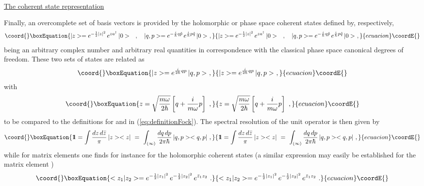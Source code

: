 \documentclass[a4paper,11pt]{article}
\def\one{1\hskip -.37em 1}
\begin{document}
\vspace{10pt}

\noindent\underline{The coherent state representation}

\vspace{5pt}

Finally, an overcomplete set of basis vectors is provided by the
holomorphic or phase space coherent states defined by, 
respectively,\cite{Klaud3}
\begin{equation}\coord{}\boxEquation{
|z>=e^{-\frac{1}{2}|z|^2}\,e^{za^\dagger}\,|0>\ \ \ ,\ \ \ 
|q,p>=e^{-\frac{i}{\hbar}q\hat{p}}\,e^{\frac{i}{\hbar}p\hat{q}}\,|0>\ ,
}{
|z>=e^{-\frac{1}{2}|z|^2}\,e^{za^\dagger}\,|0>\ \ \ ,\ \ \ 
|q,p>=e^{-\frac{i}{\hbar}q\hat{p}}\,e^{\frac{i}{\hbar}p\hat{q}}\,|0>\ ,
}{ecuacion}\coordE{}\end{equation}
\myHighlight{$z$}\coordHE{} being an arbitrary complex number and \coordHE{} arbitrary
real quantities in correspondence with the classical phase space
canonical degrees of freedom. These two sets of states are related as
\begin{equation}\coord{}\boxEquation{
|z>=e^{\frac{i}{2\hbar}qp}\,|q,p>\ ,
}{
|z>=e^{\frac{i}{2\hbar}qp}\,|q,p>\ ,
}{ecuacion}\coordE{}\end{equation}
with
\begin{equation}\coord{}\boxEquation{
z=\sqrt{\frac{m\omega}{2\hbar}}\left[q+\frac{i}{m\omega}p\right]\ ,
}{
z=\sqrt{\frac{m\omega}{2\hbar}}\left[q+\frac{i}{m\omega}p\right]\ ,
}{ecuacion}\coordE{}\end{equation}
to be compared to the definitions for \myHighlight{$a$}\coordHE{} and \coordHE{} in
(\ref{eq:definitionFock}). The spectral resolution of the unit
operator is then given by
\begin{equation}\coord{}\boxEquation{
\one=\int\frac{dz\,d\bar{z}}{\pi}\,|z><z|\ =\
\int_{(\infty)}\frac{dq\,dp}{2\pi\hbar}\,|q,p><q,p|\ ,
}{
\one=\int\frac{dz\,d\bar{z}}{\pi}\,|z><z|\ =\
\int_{(\infty)}\frac{dq\,dp}{2\pi\hbar}\,|q,p><q,p|\ ,
}{ecuacion}\coordE{}\end{equation}
while for matrix elements one finds for instance for the holomorphic
coherent states (a similar expression may easily be established for the
matrix element \myHighlight{$<q_1,p_1|q_2,p_2>$}\coordHE{})
\begin{equation}\coord{}\boxEquation{
<z_1|z_2>=e^{-\frac{1}{2}|z_1|^2}\,e^{-\frac{1}{2}|z_2|^2}\,
e^{\bar{z}_1z_2} \ .
}{
<z_1|z_2>=e^{-\frac{1}{2}|z_1|^2}\,e^{-\frac{1}{2}|z_2|^2}\,
e^{\bar{z}_1z_2} \ .
}{ecuacion}\coordE{}\end{equation}
\end{document}
